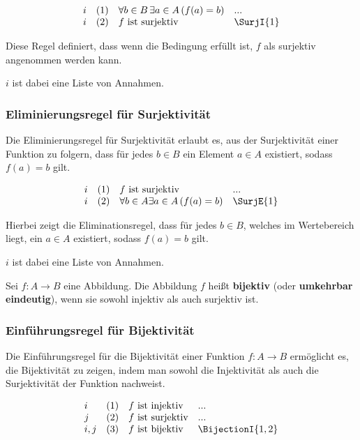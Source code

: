 \documentclass[main.tex]{subfiles}
\begin{document}
\[
\begin{array}{llll}
    i       & (1) & \forall b \in B \, \exists a \in A \, (f(a) = b) & ... \\
    i       & (2) & f \text{ ist surjektiv} & \SurjI{1}
\end{array}
\]

Diese Regel definiert, dass wenn die Bedingung erfüllt ist, \( f \) als surjektiv angenommen werden kann.

\(i\) ist dabei eine Liste von Annahmen.

\subsubsection*{Eliminierungsregel für Surjektivität}
\label{rule:SurjE}

Die Eliminierungsregel für Surjektivität erlaubt es, aus der Surjektivität einer Funktion zu folgern, dass für jedes \( b \in B \) ein Element \( a \in A \) existiert, sodass \( f(a) = b \) gilt.

\[
\begin{array}{llll}
    i       & (1) & f \text{ ist surjektiv} & ... \\
    i     & (2) & \forall b\in A\exists a \in A \, (f(a) = b) & \SurjE{1}
\end{array}
\]

Hierbei zeigt die Eliminationsregel, dass für jedes \( b \in B \), welches im Wertebereich liegt, ein \( a \in A \) existiert, sodass \( f(a) = b \) gilt.

\(i\) ist dabei eine Liste von Annahmen.

\begin{definition}[Bijektivität]
    Sei \( f: A \to B \) eine Abbildung. Die Abbildung \( f \) heißt \textbf{bijektiv} (oder \textbf{umkehrbar eindeutig}), wenn sie sowohl injektiv als auch surjektiv ist. 
\end{definition}

\subsubsection*{Einführungsregel für Bijektivität}
\label{rule:BijectionI}

Die Einführungsregel für die Bijektivität einer Funktion \( f: A \to B \) ermöglicht es, die Bijektivität zu zeigen, indem man sowohl die Injektivität als auch die Surjektivität der Funktion nachweist.

\[
\begin{array}{llll}
    i       & (1) & f \text{ ist injektiv} & ... \\
    j       & (2) & f \text{ ist surjektiv} & ... \\
    i,j     & (3) & f \text{ ist bijektiv} & \BijectionI{1,2}
\end{array}
\]
\end{document}
